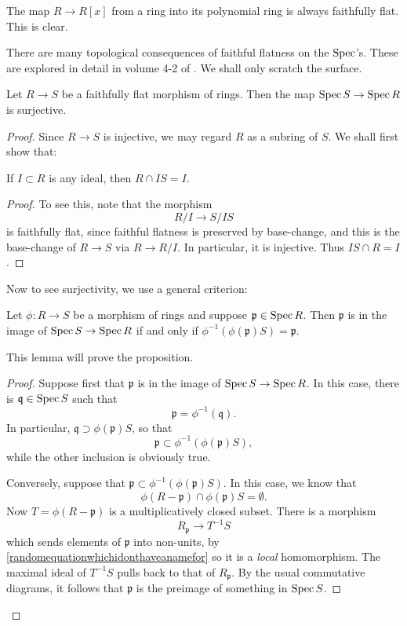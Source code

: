 \begin{example} 
The map $R \to R[x]$ from a ring into its polynomial ring is always faithfully
flat. This is clear.
\end{example} 

There are many topological consequences of faithful flatness on the $\operatorname{Spec}$'s. These are
explored in detail in volume 4-2 of \cite{EGA}. We shall only scratch the
surface.

\begin{proposition} 
Let $R \to S$ be a faithfully flat morphism of rings. Then the map $\operatorname{Spec} S
\to \operatorname{Spec} R$ is surjective.
\end{proposition} 

\begin{proof} Since $R \to S$ is injective, we may regard $R$ as a subring of $S$.
We shall first show that:

\begin{lemma} 
If $I \subset R$ is any ideal, then $R \cap IS = I$.
\end{lemma}
\begin{proof} 
To see this, note that the morphism
\[ R/I \to S/IS  \]
is faithfully flat, since faithful flatness is preserved by base-change, and
this is the base-change of $R \to S$ via $R \to R/I$.
In particular, it is injective. Thus $IS \cap R = I$.
\end{proof} 


Now to see surjectivity, we use a general criterion:

\begin{lemma} 
Let $\phi: R \to S$ be a morphism of rings and suppose $\mathfrak{p} \in \operatorname{Spec}
R$. Then $\mathfrak{p}$ is in the image of $\operatorname{Spec} S \to \operatorname{Spec} R$ if and only if 
$\phi^{-1}( \phi(\mathfrak{p}) S) = \mathfrak{p}$.
\end{lemma} 

This lemma will prove the proposition.
\begin{proof} 
Suppose first that $\mathfrak{p}$ is in the image of $\operatorname{Spec} S \to \operatorname{Spec} R$. In
this case, there is $\mathfrak{q} \in \operatorname{Spec} S$ such that
\[ \mathfrak{p} = \phi^{-1}(\mathfrak{q}).  \]
In particular, $\mathfrak{q} \supset \phi(\mathfrak{p})S$, so that
\[ \mathfrak{p} \subset \phi^{-1}(\phi(\mathfrak{p}) S),  \]
while the other inclusion is obviously true.

Conversely, suppose that $\mathfrak{p} \subset \phi^{-1}(\phi(\mathfrak{p})
S)$. In this case, we know that 
\[ \phi(R  - \mathfrak{p}) \cap \phi(\mathfrak{p})S = \emptyset.  \]
Now $T = \phi(R - \mathfrak{p})$ is a multiplicatively closed subset.
There is a morphism
\begin{equation} \label{randomequationwhichidonthaveanamefor}
R_{\mathfrak{p}} \to T^{-1}S 
\end{equation} 
which sends elements of $\mathfrak{p}$ into non-units, by
\eqref{randomequationwhichidonthaveanamefor} so it is a \emph{local}
homomorphism. The maximal ideal of $T^{-1} S$ pulls back to that of
$R_{\mathfrak{p}}$. By the usual commutative diagrams, it follows that
$\mathfrak{p}$ is the preimage of something in $\operatorname{Spec} S$.
\end{proof} 
\end{proof} 

